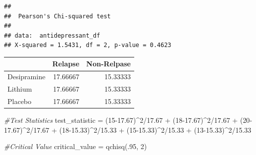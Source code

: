 \documentclass[
]{article}
\newenvironment{Shaded}{\begin{snugshade}}{\end{snugshade}}
\newcommand{\CommentTok}[1]{\textcolor[rgb]{0.56,0.35,0.01}{\textit{#1}}}
\newcommand{\DecValTok}[1]{\textcolor[rgb]{0.00,0.00,0.81}{#1}}
\newcommand{\FloatTok}[1]{\textcolor[rgb]{0.00,0.00,0.81}{#1}}
\newcommand{\FunctionTok}[1]{\textcolor[rgb]{0.00,0.00,0.00}{#1}}
\newcommand{\NormalTok}[1]{#1}
\newcommand{\OtherTok}[1]{\textcolor[rgb]{0.56,0.35,0.01}{#1}}
\newcommand{\SpecialCharTok}[1]{\textcolor[rgb]{0.00,0.00,0.00}{#1}}
\begin{document}
\begin{verbatim}
## 
##  Pearson's Chi-squared test
## 
## data:  antidepressant_df
## X-squared = 1.5431, df = 2, p-value = 0.4623
\end{verbatim}

\begin{Shaded}
\end{Shaded}

\begin{longtable}[]{@{}lrr@{}}
\toprule
& Relapse & Non-Relpase \\
\midrule
\endhead
Desipramine & 17.66667 & 15.33333 \\
Lithium & 17.66667 & 15.33333 \\
Placebo & 17.66667 & 15.33333 \\
\bottomrule
\end{longtable}

\begin{Shaded}
\begin{Highlighting}[]
\CommentTok{\#Test Statistics }
\NormalTok{test\_statistic }\OtherTok{=}\NormalTok{ (}\DecValTok{15}\FloatTok{{-}17.67}\NormalTok{)}\SpecialCharTok{\^{}}\DecValTok{2}\SpecialCharTok{/}\FloatTok{17.67} \SpecialCharTok{+} 
\NormalTok{  (}\DecValTok{18}\FloatTok{{-}17.67}\NormalTok{)}\SpecialCharTok{\^{}}\DecValTok{2}\SpecialCharTok{/}\FloatTok{17.67} \SpecialCharTok{+}\NormalTok{ (}\DecValTok{20}\FloatTok{{-}17.67}\NormalTok{)}\SpecialCharTok{\^{}}\DecValTok{2}\SpecialCharTok{/}\FloatTok{17.67} \SpecialCharTok{+} 
\NormalTok{  (}\DecValTok{18}\FloatTok{{-}15.33}\NormalTok{)}\SpecialCharTok{\^{}}\DecValTok{2}\SpecialCharTok{/}\FloatTok{15.33} \SpecialCharTok{+}\NormalTok{ (}\DecValTok{15}\FloatTok{{-}15.33}\NormalTok{)}\SpecialCharTok{\^{}}\DecValTok{2}\SpecialCharTok{/}\FloatTok{15.33} \SpecialCharTok{+}\NormalTok{ (}\DecValTok{13}\FloatTok{{-}15.33}\NormalTok{)}\SpecialCharTok{\^{}}\DecValTok{2}\SpecialCharTok{/}\FloatTok{15.33}
\end{Highlighting}
\end{Shaded}

\begin{Shaded}
\begin{Highlighting}[]
\CommentTok{\#Critical Value }
\NormalTok{critical\_value }\OtherTok{=} \FunctionTok{qchisq}\NormalTok{(.}\DecValTok{95}\NormalTok{, }\DecValTok{2}\NormalTok{)}
\end{Highlighting}
\end{Shaded}
\end{document}
